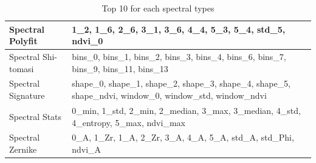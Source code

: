 \documentclass[../thesis.tex]{subfiles}
\begin{document}
\begin{table}[H]
\begin{tabularx}{\linewidth}{|l|X|}
            Spectral Polyfit & 1\_2, 1\_6, 2\_6, 3\_1, 3\_6, 4\_4, 5\_3, 5\_4, std\_5, ndvi\_0 \\ \hline
            
            Spectral Shi-tomasi & bins\_0, bins\_1, bins\_2, bins\_3, bins\_4, bins\_6, bins\_7, bins\_9, bins\_11, bins\_13 \\ \hline
            
            Spectral Signature & shape\_0, shape\_1, shape\_2, shape\_3, shape\_4, shape\_5, shape\_ndvi, window\_0, window\_std, window\_ndvi \\ \hline
            
            Spectral Stats & 0\_min, 1\_std, 2\_min, 2\_median, 3\_max, 3\_median, 4\_std, 4\_entropy, 5\_max, ndvi\_max \\ \hline
            
            Spectral Zernike & 0\_A, 1\_Zr, 1\_A, 2\_Zr, 3\_A, 4\_A, 5\_A, std\_A, std\_Phi, ndvi\_A \\ \hline
        \end{tabularx}
        \caption{Top 10 for each spectral types}
        \label{tab:feature-name-spectral}
    \end{table}
    \vfill
    \null
    
\end{document}
